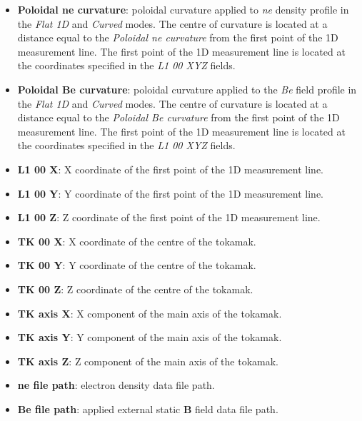 \begin{itemize}
\begin{itemize}
    \end{itemize}
    \vspace{0.5em}
	\item \textbf{Poloidal ne curvature}: poloidal curvature applied to \textit{ne} density profile in the \textit{Flat 1D} and \textit{Curved} modes. The centre of curvature is located at a distance equal to the \textit{Poloidal ne curvature} from the first point of the 1D measurement line. The first point of the 1D measurement line is located at the coordinates specified in the \textit{L1 00 XYZ} fields.
	\vspace{0.75em}
	\item \textbf{Poloidal Be curvature}: poloidal curvature applied to the \textit{Be} field profile in the \textit{Flat 1D} and \textit{Curved} modes. The centre of curvature is located at a distance equal to the \textit{Poloidal Be curvature} from the first point of the 1D measurement line. The first point of the 1D measurement line is located at the coordinates specified in the \textit{L1 00 XYZ} fields.	
    \vspace{1.0em}
	\item \textbf{L1 00 X}: X coordinate of the first point of the 1D measurement line.
	\item \textbf{L1 00 Y}: Y coordinate of the first point of the 1D measurement line.
	\item \textbf{L1 00 Z}: Z coordinate of the first point of the 1D measurement line.
	\\
	\item \textbf{TK 00 X}: X coordinate of the centre of the tokamak.
	\item \textbf{TK 00 Y}: Y coordinate of the centre of the tokamak.
	\item \textbf{TK 00 Z}: Z coordinate of the centre of the tokamak.
	\\
	\item \textbf{TK axis X}: X component of the main axis of the tokamak.
    \item \textbf{TK axis Y}: Y component of the main axis of the tokamak.
    \item \textbf{TK axis Z}: Z component of the main axis of the tokamak.
    \\
    \item \textbf{ne file path}: electron density data file path.
    \item \textbf{Be file path}: applied external static \textbf{B} field data file path.
\end{itemize}

